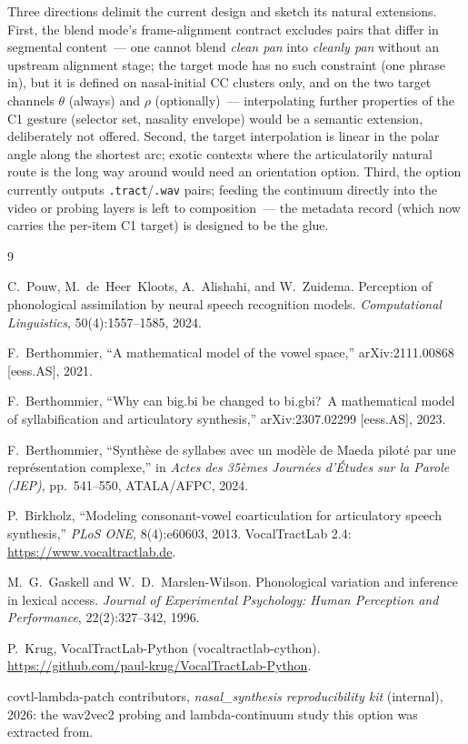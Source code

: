 \documentclass[11pt,a4paper]{article}
\newcommand{\code}[1]{\texttt{#1}}
\begin{document}
Three directions delimit the current design and sketch its natural
extensions.  First, the blend mode's frame-alignment contract
excludes pairs that differ in segmental content~--- one cannot
blend \emph{clean pan} into \emph{cleanly pan} without an upstream
alignment stage; the target mode has no such constraint (one phrase
in), but it is defined on nasal-initial CC clusters only, and on
the two target channels $\theta$ (always) and $\rho$
(optionally)~--- interpolating further properties of the C1 gesture
(selector set, nasality envelope) would be a semantic extension,
deliberately not offered.  Second, the target interpolation is
linear in the polar angle along the shortest arc; exotic contexts
where the articulatorily natural route is the long way around would
need an orientation option.  Third, the option currently outputs
\code{.tract}/\code{.wav} pairs; feeding the continuum directly
into the video or probing layers is left to composition~--- the
metadata record (which now carries the per-item C1 target) is
designed to be the glue.

\begin{thebibliography}{9}\label{sec:refs}

C.~Pouw, M.~de~Heer~Kloots, A.~Alishahi, and W.~Zuidema.
\newblock Perception of phonological assimilation by neural speech
  recognition models.
\newblock \emph{Computational Linguistics}, 50(4):1557--1585, 2024.

F.~Berthommier, ``A mathematical model of the vowel space,''
arXiv:2111.00868 [eess.AS], 2021.

F.~Berthommier, ``Why can big.bi be changed to bi.gbi?~A
mathematical model of syllabification and articulatory synthesis,''
arXiv:2307.02299 [eess.AS], 2023.

F.~Berthommier, ``Synth\`ese de syllabes avec un mod\`ele de Maeda
pilot\'e par une repr\'esentation complexe,'' in \emph{Actes des
35\`emes Journ\'ees d'\'Etudes sur la Parole (JEP)}, pp.~541--550,
ATALA/AFPC, 2024.

P.~Birkholz, ``Modeling consonant-vowel coarticulation for
articulatory speech synthesis,'' \emph{PLoS ONE}, 8(4):e60603,
2013. VocalTractLab 2.4: \url{https://www.vocaltractlab.de}.

M.~G.~Gaskell and W.~D.~Marslen-Wilson.
\newblock Phonological variation and inference in lexical access.
\newblock \emph{Journal of Experimental Psychology: Human Perception and
  Performance}, 22(2):327--342, 1996.

P.~Krug, VocalTractLab-Python (vocaltractlab-cython).
\url{https://github.com/paul-krug/VocalTractLab-Python}.

covtl-lambda-patch contributors, \emph{nasal\_synthesis
reproducibility kit} (internal), 2026: the wav2vec2 probing and
lambda-continuum study this option was extracted from.

\end{thebibliography}
\end{document}
